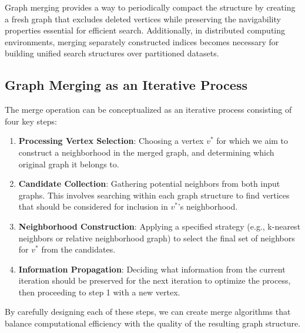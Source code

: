 \documentclass{article}
\begin{document}
Graph merging provides a way to periodically compact the structure by creating a fresh graph that excludes deleted vertices while preserving the navigability properties essential for efficient search. Additionally, in distributed computing environments, merging separately constructed indices becomes necessary for building unified search structures over partitioned datasets.

\subsection{Graph Merging as an Iterative Process}

The merge operation can be conceptualized as an iterative process consisting of four key steps:

\begin{enumerate}
    \item \textbf{Processing Vertex Selection}: Choosing a vertex $v^*$ for which we aim to construct a neighborhood in the merged graph, and determining which original graph it belongs to.
   
    \item \textbf{Candidate Collection}: Gathering potential neighbors from both input graphs. This involves searching within each graph structure to find vertices that should be considered for inclusion in $v^*$'s neighborhood.
   
    \item \textbf{Neighborhood Construction}: Applying a specified strategy (e.g., k-nearest neighbors or relative neighborhood graph) to select the final set of neighbors for $v^*$ from the candidates.
   
    \item \textbf{Information Propagation}: Deciding what information from the current iteration should be preserved for the next iteration to optimize the process, then proceeding to step 1 with a new vertex.
\end{enumerate}

By carefully designing each of these steps, we can create merge algorithms that balance computational efficiency with the quality of the resulting graph structure. 
\end{document}
